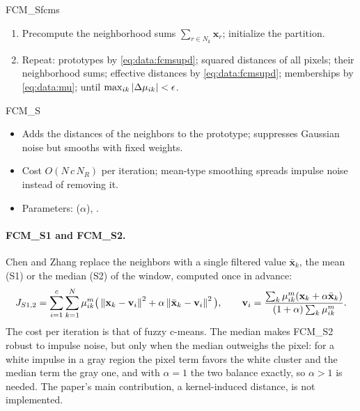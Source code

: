 \begin{algobox}{FCM\_S}{fcms}
\begin{enumerate}[leftmargin=*]
  \item Precompute the neighborhood sums $\sum_{r\in N_k}\mathbf{x}_r$; initialize the partition.
  \item Repeat: prototypes by \eqref{eq:data:fcmsupd}; squared distances of all pixels; their neighborhood sums; effective distances by \eqref{eq:data:fcmsupd}; memberships by \eqref{eq:data:mu}; until $\max_{ik}\left\lvert \Delta\mu_{ik} \right\rvert<\epsilon$.
\end{enumerate}
\end{algobox}
\begin{summarybox}{FCM\_S}
\begin{itemize}
  \item Adds the distances of the neighbors to the prototype; suppresses Gaussian noise but smooths with fixed weights.
  \item Cost $O(N\,c\,N_R)$ per iteration; mean-type smoothing spreads impulse noise instead of removing it.
  \item Parameters:  ($\alpha$), .
\end{itemize}
\end{summarybox}

\paragraph{FCM\_S1 and FCM\_S2.} Chen and Zhang \cite{chen:2004:fcms12} replace the neighbors with a single filtered value $\bar{\mathbf{x}}_k$, the mean (S1) or the median (S2) of the window, computed once in advance:
\begin{equation}
  J_{S1,2}=\sum_{i=1}^{c}\sum_{k=1}^{N}\mu_{ik}^m\big(\left\lVert \mathbf{x}_k-\mathbf{v}_i \right\rVert^2+\alpha\left\lVert \bar{\mathbf{x}}_k-\mathbf{v}_i \right\rVert^2\big),\qquad
  \mathbf{v}_i=\frac{\sum_k\mu_{ik}^m(\mathbf{x}_k+\alpha\bar{\mathbf{x}}_k)}{(1+\alpha)\sum_k\mu_{ik}^m} .
  \label{eq:data:fcms12}
\end{equation}
The cost per iteration is that of fuzzy c-means. The median makes FCM\_S2 robust to impulse noise, but only when the median outweighs the pixel: for a white impulse in a gray region the pixel term favors the white cluster and the median term the gray one, and with $\alpha=1$ the two balance exactly, so $\alpha>1$ is needed. The paper's main contribution, a kernel-induced distance, is not implemented.

